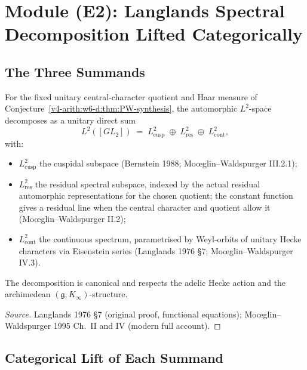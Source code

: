 \section{Module (E2): Langlands Spectral Decomposition Lifted Categorically}
\label{v4-arith:w6-d:E2}

\subsection{The Three Summands}

\begin{theorem}
\label{v4-arith:w6-d:thm:Langlands-decomp}
\ClaimStatusProvedElsewhere For the fixed unitary central-character quotient and Haar measure of
Conjecture~\ref{v4-arith:w6-d:thm:PW-synthesis}, the automorphic \(L^{2}\)-space
decomposes as a unitary direct sum
\begin{equation}
\label{v4-arith:w6-d:eq:Langlands-decomp}
L^{2}([GL_{2}])\;=\;L^{2}_{\mathrm{cusp}}\;\oplus\;L^{2}_{\mathrm{res}}\;\oplus\;L^{2}_{\mathrm{cont}},
\end{equation}
with:
\begin{itemize}
\item \(L^{2}_{\mathrm{cusp}}\) the cuspidal subspace
(Bernstein 1988; Mo{\oe}glin--Waldspurger III.2.1);
\item \(L^{2}_{\mathrm{res}}\) the residual spectral subspace, indexed by the actual residual automorphic representations for the chosen quotient; the constant function gives a residual line when the central character and quotient allow it
(Mo{\oe}glin--Waldspurger II.2);
\item \(L^{2}_{\mathrm{cont}}\) the continuous spectrum, parametrised
by Weyl-orbits of unitary Hecke characters via Eisenstein series
(Langlands 1976 \S 7; Mo{\oe}glin--Waldspurger IV.3).
\end{itemize}
The decomposition is canonical and respects the adelic Hecke action
and the archimedean \((\mathfrak{g},K_{\infty})\)-structure.
\end{theorem}

\begin{proof}[Source]
Langlands 1976 \S 7 (original proof, functional equations);
Mo{\oe}glin--Waldspurger 1995 Ch.~II and IV (modern full account).
\end{proof}

\subsection{Categorical Lift of Each Summand}

